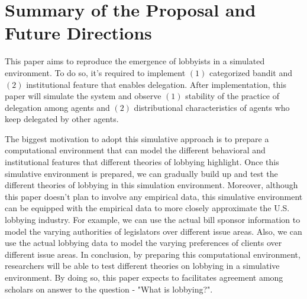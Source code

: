 \documentclass{article}
\begin{document}
\section{Summary of the Proposal and Future Directions}
 
This paper aims to reproduce the emergence of lobbyists in a simulated environment.
To do so, it's required to implement $(1)$ categorized bandit \citep{NEURIPS2019_83462e22} and $(2)$ institutional feature that enables delegation.
After implementation, this paper will simulate the system and observe $(1)$ stability of the practice of delegation among agents and $(2)$ distributional characteristics of agents who keep delegated by other agents.
 
The biggest motivation to adopt this simulative approach is to prepare a computational environment that can model the different behavioral and institutional features that different theories of lobbying highlight.
Once this simulative environment is prepared, we can gradually build up and test the different theories of lobbying in this simulation environment.
Moreover, although this paper doesn't plan to involve any empirical data, this simulative environment can be equipped with the empirical data to more closely approximate the U.S. lobbying industry.
For example, we can use the actual bill sponsor information to model the varying authorities of legislators over different issue areas. Also, we can use the actual lobbying data to model the varying preferences of clients over different issue areas.
In conclusion, by preparing this computational environment, researchers will be able to test different theories on lobbying in a simulative environment. By doing so, this paper expects to facilitates agreement among scholars on answer to the question - "What is lobbying?".
\end{document}
